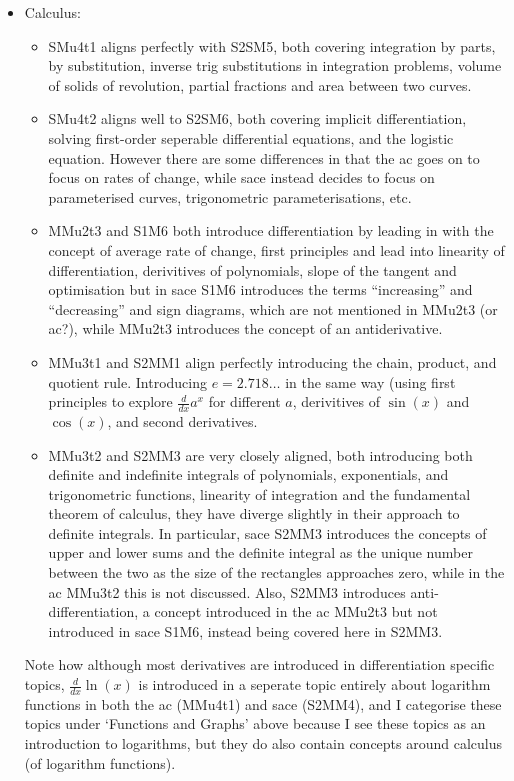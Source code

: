 \documentclass[twoside,12pt,a4paper]{report}
\begin{document}
\begin{itemize}
	\item Calculus: 
		\begin{itemize}
			\item SMu4t1 aligns perfectly with S2SM5, both covering integration by parts, by substitution, inverse trig substitutions in integration problems, volume of solids of revolution, partial fractions and area between two curves. 
			\item SMu4t2 aligns well to S2SM6, both covering implicit differentiation, solving first-order seperable differential equations, and the logistic equation. However there are some differences in that the \gls{ac} goes on to focus on rates of change, while \gls{sace} instead decides to focus on parameterised curves, trigonometric parameterisations, etc.
			\item MMu2t3 and S1M6 both introduce differentiation by leading in with the concept of average rate of change, first principles and lead into linearity of differentiation, derivitives of polynomials, slope of the tangent and optimisation but in \gls{sace} S1M6 introduces the terms ``increasing'' and ``decreasing'' and sign diagrams, which are not mentioned in MMu2t3 (or \gls{ac}?), while MMu2t3 introduces the concept of an antiderivative.  
			\item MMu3t1 and S2MM1 align perfectly introducing the chain, product, and quotient rule. Introducing $e = 2.718\hdots$ in the same way (using first principles to explore $\frac{d}{dx}{a^x}$ for different $a$, derivitives of $\sin(x)$ and $\cos(x)$, and second derivatives.  
			\item MMu3t2 and S2MM3 are very closely aligned, both introducing both definite and indefinite integrals of polynomials, exponentials, and trigonometric functions, linearity of integration and the fundamental theorem of calculus, they have diverge slightly in their approach to definite integrals. In particular, \gls{sace} S2MM3 introduces the concepts of upper and lower sums and the definite integral as the unique number between the two as the size of the rectangles approaches zero, while in the \gls{ac} MMu3t2 this is not discussed. Also, S2MM3 introduces anti-differentiation, a concept introduced in the \gls{ac} MMu2t3 but not introduced in \gls{sace} S1M6, instead being covered here in S2MM3.
		\end{itemize}
	Note how although most derivatives are introduced in differentiation specific topics, $\frac{d}{dx}\ln(x)$ is introduced in a seperate topic entirely about logarithm functions in both the \gls{ac} (MMu4t1) and \gls{sace} (S2MM4), and I categorise these topics under `Functions and Graphs' above because I see these topics as an introduction to logarithms, but they do also contain concepts around calculus (of logarithm functions).

\end{itemize}
\end{document}
